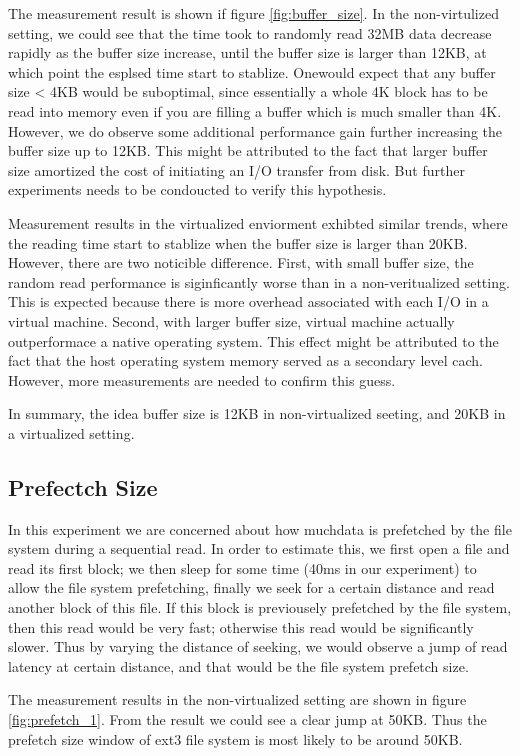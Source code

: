 The measurement result is shown if figure \ref{fig:buffer_size}. In the non-virtulized setting, we could see that the time took to randomly read 32MB data decrease rapidly as the buffer size increase, until the buffer size is larger than 12KB, at which point the esplsed time start to stablize. Onewould expect that any buffer size < 4KB would be suboptimal, since essentially a whole 4K block has to be read into memory even if you are filling a buffer which is much smaller than 4K. However, we do observe some additional performance gain further increasing the buffer size up to 12KB. This might be attributed to the fact that larger buffer size amortized the cost of initiating an I/O transfer from disk. But further experiments needs to be condoucted to verify this hypothesis. 

Measurement results in the virtualized enviorment exhibted similar trends, where the reading time start to stablize when the buffer size is larger than 20KB. However, there are two noticible difference. First, with small buffer size, the random read performance is siginficantly worse than in a non-veritualized setting. This is expected because there is more overhead associated with each I/O in a virtual machine. Second, with larger buffer size, virtual machine actually outperformace a native operating system. This effect might be attributed to the fact that the host operating system memory served as a secondary level cach. However, more measurements are needed to confirm this guess. 

In summary, the idea buffer size is 12KB in non-virtualized seeting, and 20KB in a virtualized setting.

\subsection{Prefectch Size}
In this experiment we are concerned about how muchdata is prefetched by the file system during a sequential read. In order to estimate this, we first open a file and read its first block; we then sleep for some time (40ms in our experiment) to allow the file system prefetching, finally we seek for a certain distance and read another block of this file. If this block is previousely prefetched by the file system, then this read would be very fast; otherwise this read would be significantly slower. Thus by varying the distance of seeking, we would observe a jump of read latency at certain distance, and that would be the file system prefetch size. 

The measurement results in the non-virtualized setting are shown in figure \ref{fig:prefetch_1}. From the result we could see a clear jump at 50KB. Thus the prefetch size window of ext3 file system is most likely to be around 50KB.

